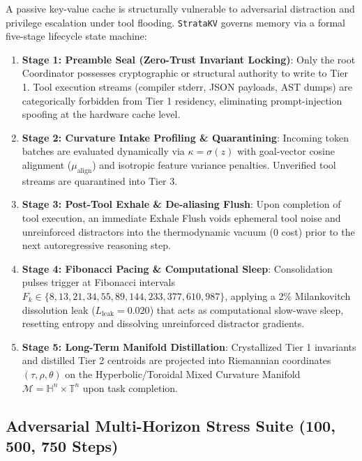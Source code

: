 A passive key-value cache is structurally vulnerable to adversarial distraction and privilege escalation under tool flooding. \texttt{StrataKV} governs memory via a formal five-stage lifecycle state machine:
\begin{enumerate}
    \item \textbf{Stage 1: Preamble Seal (Zero-Trust Invariant Locking)}: Only the root Coordinator possesses cryptographic or structural authority to write to Tier 1. Tool execution streams (compiler stderr, JSON payloads, AST dumps) are categorically forbidden from Tier 1 residency, eliminating prompt-injection spoofing at the hardware cache level.
    \item \textbf{Stage 2: Curvature Intake Profiling \& Quarantining}: Incoming token batches are evaluated dynamically via $\kappa = \sigma(z)$ with goal-vector cosine alignment ($\mu_{\text{align}}$) and isotropic feature variance penalties. Unverified tool streams are quarantined into Tier 3.
    \item \textbf{Stage 3: Post-Tool Exhale \& De-aliasing Flush}: Upon completion of tool execution, an immediate Exhale Flush voids ephemeral tool noise and unreinforced distractors into the thermodynamic vacuum ($0$ cost) prior to the next autoregressive reasoning step.
    \item \textbf{Stage 4: Fibonacci Pacing \& Computational Sleep}: Consolidation pulses trigger at Fibonacci intervals $F_k \in \{8, 13, 21, 34, 55, 89, 144, 233, 377, 610, 987\}$, applying a 2\% Milankovitch dissolution leak ($L_{\text{leak}} = 0.020$) that acts as computational slow-wave sleep, resetting entropy and dissolving unreinforced distractor gradients.
    \item \textbf{Stage 5: Long-Term Manifold Distillation}: Crystallized Tier 1 invariants and distilled Tier 2 centroids are projected into Riemannian coordinates $(\tau, \rho, \theta)$ on the Hyperbolic/Toroidal Mixed Curvature Manifold $\mathcal{M} = \mathbb{H}^n \times \mathbb{T}^n$ upon task completion.
\end{enumerate}

\subsection{Adversarial Multi-Horizon Stress Suite (100, 500, 750 Steps)}

